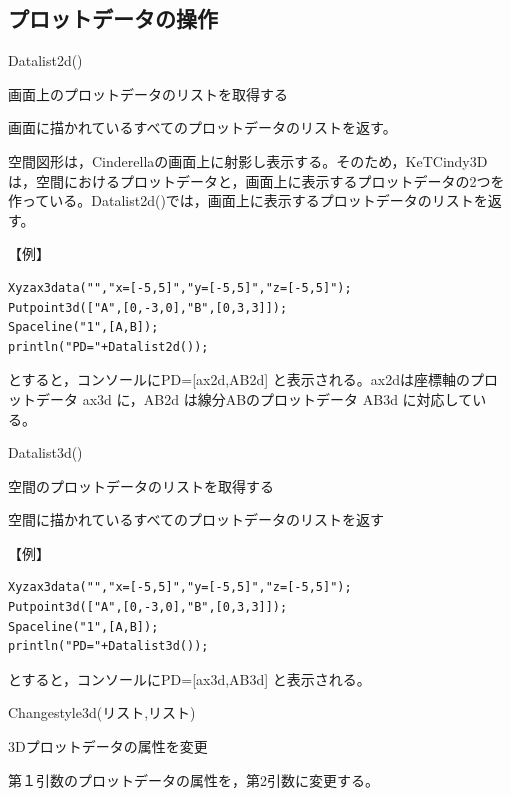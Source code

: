 \documentclass[papersize,a4paper,12pt,uplatex]{jsarticle}
\begin{document}
\subsection{プロットデータの操作}

\begin{description}
\vspace{\baselineskip}
\hypertarget{datalist}{}
\item[関数]Datalist2d()
\item[機能]画面上のプロットデータのリストを取得する
\item[説明]画面に描かれているすべてのプロットデータのリストを返す。

空間図形は，Cinderellaの画面上に射影し表示する。そのため，KeTCindy3Dは，空間におけるプロットデータと，画面上に表示するプロットデータの2つを作っている。Datalist2d()では，画面上に表示するプロットデータのリストを返す。

\vspace{\baselineskip}
【例】
\begin{verbatim}
Xyzax3data("","x=[-5,5]","y=[-5,5]","z=[-5,5]");
Putpoint3d(["A",[0,-3,0],"B",[0,3,3]]);
Spaceline("1",[A,B]);
println("PD="+Datalist2d());
\end{verbatim}
とすると，コンソールにPD=[ax2d,AB2d] と表示される。ax2dは座標軸のプロットデータ ax3d に，AB2d は線分ABのプロットデータ AB3d に対応している。
\vspace{\baselineskip}
\hypertarget{datalist}{}
\item[関数]Datalist3d()
\item[機能]空間のプロットデータのリストを取得する
\item[説明]空間に描かれているすべてのプロットデータのリストを返す

\vspace{\baselineskip}
【例】
\begin{verbatim}
Xyzax3data("","x=[-5,5]","y=[-5,5]","z=[-5,5]");
Putpoint3d(["A",[0,-3,0],"B",[0,3,3]]);
Spaceline("1",[A,B]);
println("PD="+Datalist3d());
\end{verbatim}
とすると，コンソールにPD=[ax3d,AB3d] と表示される。

\vspace{\baselineskip}

\hypertarget{changestyle3d}{}
\item[関数]Changestyle3d(リスト,リスト)
\item[機能]3Dプロットデータの属性を変更
\item[説明]第１引数のプロットデータの属性を，第2引数に変更する。


\end{description}
\end{document}
